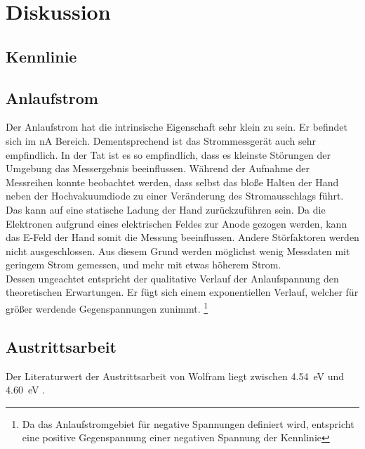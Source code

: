


\section{Diskussion}
\label{sec:Diskussion}


 
\cite{Austrittsarbeit}

\subsection{Kennlinie}


\subsection{Anlaufstrom}

Der Anlaufstrom hat die intrinsische Eigenschaft sehr klein zu sein. Er befindet sich im \unit{\nano \ampere} Bereich. 
Dementsprechend ist das Strommessgerät auch sehr empfindlich. In der Tat ist es so empfindlich, dass es kleinste Störungen 
der Umgebung das Messergebnis beeinflussen. Während der Aufnahme der Messreihen konnte beobachtet werden, dass selbst das 
bloße Halten der Hand neben der Hochvakuumdiode zu einer Veränderung des Stromausschlags führt. Das kann auf eine statische 
Ladung der Hand zurückzuführen sein. Da die Elektronen aufgrund eines elektrischen Feldes zur Anode gezogen werden, kann das 
E-Feld der Hand somit die Messung beeinflussen. Andere Störfaktoren werden nicht ausgeschlossen. Aus diesem Grund werden 
möglichst wenig Messdaten mit geringem Strom gemessen, und mehr mit etwas höherem Strom. \\
\noindent Dessen ungeachtet entspricht der qualitative Verlauf der Anlaufspannung den theoretischen Erwartungen. Er fügt sich 
einem exponentiellen Verlauf, welcher für größer werdende Gegenspannungen zunimmt. \footnote{Da das Anlaufstromgebiet für 
negative Spannungen definiert wird, entspricht eine positive Gegenspannung einer negativen Spannung der Kennlinie} 


\subsection{Austrittsarbeit}

Der Literaturwert der Austrittsarbeit von Wolfram liegt zwischen \qty{4.54}{\electronvolt} und \qty{4.60}{\electronvolt} 
\cite{Austrittsarbeit}.





